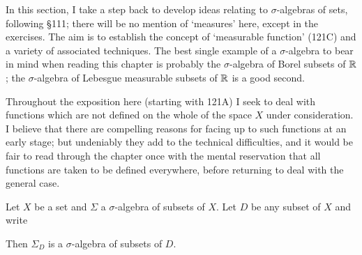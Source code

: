      
\def\chaptername{Integration}
\def\sectionname{Measurable functions}
     
     
In this section, I take a step back to develop ideas relating to
$\sigma$-algebras of sets, following \S111;  there will be no mention
of `measures' here, except in the exercises.   The aim is to
establish the concept of `measurable function' (121C) and a variety of 
associated techniques.
The best single example of a $\sigma$-algebra to bear in mind when
reading this chapter is probably the $\sigma$-algebra of Borel subsets of
$\Bbb R$;  the 
$\sigma$-algebra of Lebesgue measurable subsets of 
$\Bbb R$ is a good second.
     
Throughout the exposition here (starting with 121A) I seek to deal with
functions which are not defined on the whole of the space $X$ under
consideration.   I believe that there are compelling reasons for facing
up to such functions at an early stage;  but undeniably
they add to the technical difficulties, and it would be fair to read
through the chapter once with the mental reservation that all functions
are taken to be defined everywhere, before returning to deal with the
general case.
     
     
 Let $X$ be a set and $\Sigma$ a $\sigma$-algebra of
subsets of $X$.   Let $D$ be any subset of $X$ and write
     
     
\noindent Then $\Sigma_D$ is a $\sigma$-algebra of subsets of $D$.
     
     

